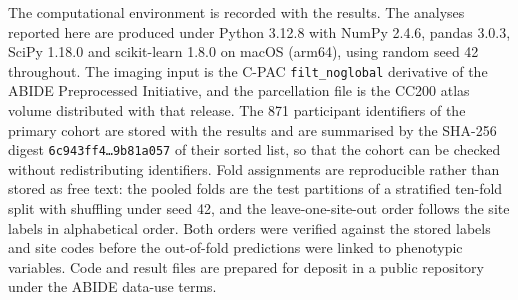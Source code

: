 The computational environment is recorded with the results. The analyses reported here are produced under Python 3.12.8 with NumPy 2.4.6, pandas 3.0.3, SciPy 1.18.0 and scikit-learn 1.8.0 on macOS (arm64), using random seed 42 throughout. The imaging input is the C-PAC \texttt{filt\_noglobal} derivative of the ABIDE Preprocessed Initiative, and the parcellation file is the CC200 atlas volume distributed with that release. The 871 participant identifiers of the primary cohort are stored with the results and are summarised by the SHA-256 digest \texttt{6c943ff4\ldots9b81a057} of their sorted list, so that the cohort can be checked without redistributing identifiers. Fold assignments are reproducible rather than stored as free text: the pooled folds are the test partitions of a stratified ten-fold split with shuffling under seed 42, and the leave-one-site-out order follows the site labels in alphabetical order. Both orders were verified against the stored labels and site codes before the out-of-fold predictions were linked to phenotypic variables. Code and result files are prepared for deposit in a public repository under the ABIDE data-use terms.
